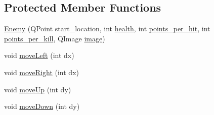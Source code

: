 \subsection*{Protected Member Functions}
\begin{DoxyCompactItemize}
\item 
\hyperlink{classEnemy_ab27454ba27030bc72ef3a1ca56bc7283}{Enemy} (QPoint start\_\-location, int \hyperlink{classEnemy_aedd5e7bf8ef07ee97be433c853a10d8d}{health}, int \hyperlink{classEnemy_a04d876545226672f5e3409359d2210be}{points\_\-per\_\-hit}, int \hyperlink{classEnemy_a217aa59401d8bfc8a20df630238fd3c5}{points\_\-per\_\-kill}, QImage \hyperlink{classEnemy_a2998d1a603172afaffb8011516286eff}{image})
\item 
void \hyperlink{classEnemy_a1b568d05f49aa61851e0b5dbc829e0f9}{moveLeft} (int dx)
\item 
void \hyperlink{classEnemy_a08fad3127a3e8c0950f977fa03add312}{moveRight} (int dx)
\item 
void \hyperlink{classEnemy_af1b125c99ea3a6d2fb2e4d65af3c1fd6}{moveUp} (int dy)
\item 
void \hyperlink{classEnemy_a3a5f0da76cabbd327d0c1c7fe0b84c37}{moveDown} (int dy)
\end{DoxyCompactItemize}
